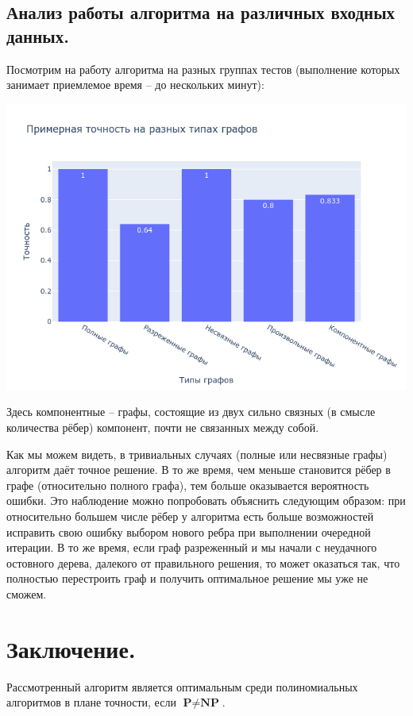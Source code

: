 \documentclass[a4paper,11pt]{article}
\theoremstyle{plain}
\theoremstyle{definition}
\theoremstyle{remark}
\begin{document}
\subsection{Анализ работы алгоритма на различных входных данных.}

Посмотрим на работу алгоритма на разных группах тестов (выполнение которых занимает приемлемое время -- до нескольких минут):

\includegraphics[scale=0.72]{../src/accuracy_plot.png}

Здесь компонентные -- графы, состоящие из двух сильно связных (в смысле количества рёбер) компонент, почти не связанных между собой.

Как мы можем видеть, в тривиальных случаях (полные или несвязные графы) алгоритм даёт точное решение. В то же время, чем меньше становится рёбер в графе (относительно полного графа), тем больше оказывается вероятность ошибки. Это наблюдение можно попробовать объяснить следующим образом: при относительно большем числе рёбер у алгоритма есть больше возможностей исправить свою ошибку выбором нового ребра при выполнении очередной итерации. В то же время, если граф разреженный и мы начали с неудачного остовного дерева, далекого от правильного решения, то может оказаться так, что полностью перестроить граф и получить оптимальное решение мы уже не сможем.

\section{Заключение.}
Рассмотренный алгоритм является оптимальным среди полиномиальных алгоритмов в плане точности, если $\textbf{P} \neq \textbf{NP}$.
\end{document}
